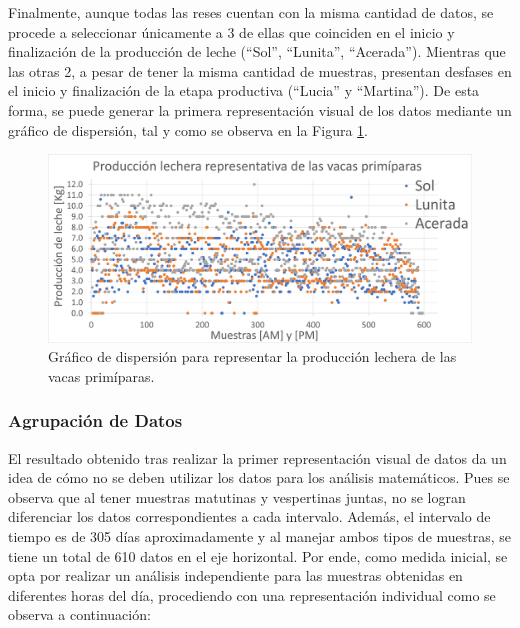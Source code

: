 Finalmente, aunque todas las reses cuentan con la misma cantidad de datos, se procede a seleccionar únicamente a 3 de ellas que coinciden en el inicio y finalización de la producción de leche (``Sol'', ``Lunita'', ``Acerada''). Mientras que las otras 2, a pesar de tener la misma cantidad de muestras, presentan desfases en el inicio y finalización de la etapa productiva (``Lucia'' y ``Martina''). De esta forma, se puede generar la primera representación visual de los datos mediante un gráfico de dispersión, tal y como se observa en la Figura \ref{scatterparto1png}.

\begin{figure}[H]
	 \begin{center}
	 \includegraphics[scale=0.452]{img/scatterparto1.jpg}
	 \end{center}
	 \caption{Gráfico de dispersión para representar la producción lechera de las vacas primíparas. \label{scatterparto1png}}
\end{figure}

\subsubsection{Agrupación de Datos}\label{agrupdat}

El resultado obtenido tras realizar la primer representación visual de datos da un idea de cómo no se deben utilizar los datos para los análisis matemáticos. Pues se observa que al tener muestras matutinas y vespertinas juntas, no se logran diferenciar los datos correspondientes a cada intervalo. Además, el intervalo de tiempo es de 305 días aproximadamente y al manejar ambos tipos de muestras, se tiene un total de 610 datos en el eje horizontal. Por ende, como medida inicial, se opta por realizar un análisis independiente para las muestras obtenidas en diferentes horas del día, procediendo con una representación individual como se observa a continuación:

